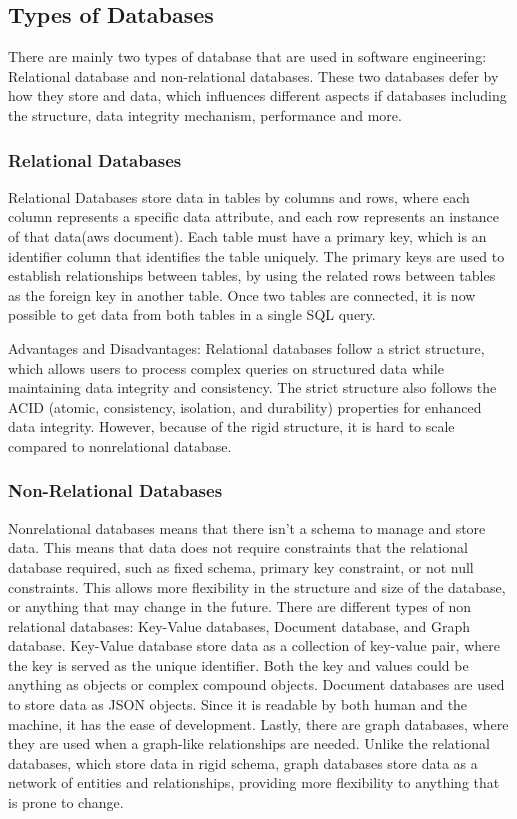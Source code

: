 \subsection[Types of Databases]{Types of Databases}
There are mainly two types of database that are used in software engineering: Relational database and non-relational databases. 
These two databases defer by how they store and data, which influences different aspects if databases including the structure, data integrity mechanism, performance and more. 

\subsubsection[Relational Databases]{Relational Databases}
Relational Databases store data in tables by columns and rows, where each column represents a specific data attribute, 
and each row represents an instance of that data(aws document). Each table must have a primary key, which is an identifier column that identifies the table uniquely.
The primary keys are used to establish relationships between tables, by using the related rows between tables as the foreign key in another table. 
Once two tables are connected, it is now possible to get data from both tables in a single SQL query.

Advantages and Disadvantages:
Relational databases follow a strict structure, which allows users to process complex queries on structured data while maintaining data integrity and consistency. 
The strict structure also follows the ACID (atomic, consistency, isolation, and durability) properties for enhanced data integrity. 
However, because of the rigid structure, it is hard to scale compared to nonrelational database.  
\subsubsection[Non-Relational Databases]{Non-Relational Databases}
Nonrelational databases means that there isn’t a schema to manage and store data. 
This means that data does not require constraints that the relational database required, such as fixed schema, primary key constraint, or not null constraints. 
This allows more flexibility in the structure and size of the database, or anything that may change in the future. 
There are different types of non relational databases: Key-Value databases, Document database, and Graph database. 
Key-Value database store data as a collection of key-value pair, where the key is served as the unique identifier. 
Both the key and values could be anything as objects or complex compound objects. Document databases are used to store data as JSON objects. 
Since it is readable by both human and the machine, it has the ease of development. Lastly, there are graph databases, 
where they are used when a graph-like relationships are needed. Unlike the relational databases, which store data in rigid schema, 
graph databases store data as a network of entities and relationships, providing more flexibility to anything that is prone to change. 

